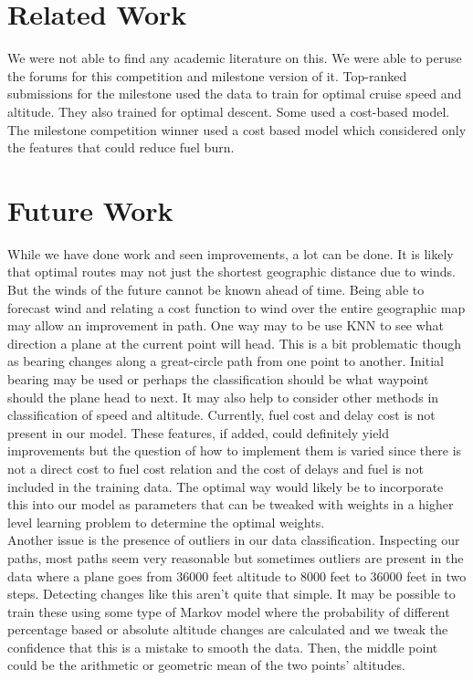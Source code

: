 \documentclass{article}[12pt]
\begin{document}
\begin{multicols}{2}
\section{Related Work}
We were not able to find any academic literature on this. We were able to peruse the forums for this competition and milestone version of it. Top-ranked submissions for the milestone used the data to train for optimal cruise speed and altitude. They also trained for optimal descent. Some used a cost-based model. The milestone competition winner used a cost based model which considered only the features that could reduce fuel burn. 

\section{Future Work}
While we have done work and seen improvements, a lot can be done. It is likely that optimal routes may not just the shortest geographic distance due to winds. But the winds of the future cannot be known ahead of time. Being able to forecast wind and relating a cost function to wind over the entire geographic map may allow an improvement in path. One way may to be use KNN to see what direction a plane at the current point will head. This is a bit problematic though as bearing changes along a great-circle path from one point to another. Initial bearing may be used or perhaps the classification should be what waypoint should the plane head to next. It may also help to consider other methods in classification of speed and altitude. Currently, fuel cost and delay cost is not present in our model. These features, if added, could definitely yield improvements but the question of how to implement them is varied since there is not a direct cost to fuel cost relation and the cost of delays and fuel is not included in the training data. The optimal way would likely be to incorporate this into our model as parameters that can be tweaked with weights in a higher level learning problem to determine the optimal weights. \\

Another issue is the presence of outliers in our data classification. Inspecting our paths, most paths seem very reasonable but sometimes outliers are present in the data where a plane goes from 36000 feet altitude to 8000 feet to 36000 feet in two steps. Detecting changes like this aren't quite that simple. It may be possible to train these using some type of Markov model where the probability of different percentage based or absolute altitude changes are calculated and we tweak the confidence that this is a mistake to smooth the data. Then, the middle point could be the arithmetic or geometric mean of the two points' altitudes.


\end{multicols}
\end{document}
